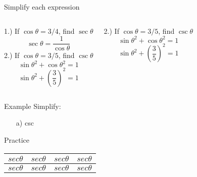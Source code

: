 \documentclass{beamer}
\begin{document}
\begin{frame}{Simplify each expression}
\begin{columns}
    1.) If $\cos{\theta} = 3/4$, find $\sec{\theta}$
    \begin{equation*}
        \sec{\theta}=\frac{1}{\cos{\theta}}
    \end{equation*}
    2.) If $\cos{\theta} = 3/5$, find $\csc{\theta}$
    \begin{equation*}
        \sin{\theta} ^ 2 + \cos{\theta} ^ 2 = 1
    \end{equation*}
    \begin{equation*}
        \sin{\theta} ^ 2 + (\frac{3}{5}) ^ 2 = 1
    \end{equation*}
    
    2.) If $\cos{\theta} = 3/5$, find $\csc{\theta}$
    \begin{equation*}
        \sin{\theta} ^ 2 + \cos{\theta} ^ 2 = 1
    \end{equation*}
    \begin{equation*}
        \sin{\theta} ^ 2 + (\frac{3}{5}) ^ 2 = 1
    \end{equation*}
\end{columns}

\end{frame}



\begin{frame}{Example}
    Simplify:
    \begin{enumerate}
        \item [a)] csc
    \end{enumerate}
\end{frame}




\begin{frame}{Practice}
    \centering
    \begin{tabular}{|c|c|c|c|}
         \hline
         $sec\theta$&$sec\theta$ &$sec\theta$ &$sec\theta$ \\
         \hline
         $sec\theta$&$sec\theta$ &$sec\theta$ &$sec\theta$ \\
         \hline
    \end{tabular}
\end{frame}


\newlength{\R}\setlength{\R}{2.7cm}
\end{document}
